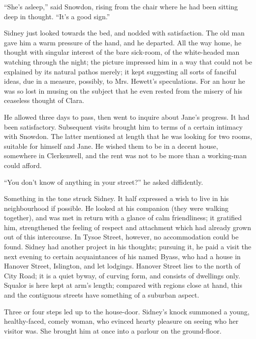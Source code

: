 ``She's asleep,'' said Snowdon, rising from the chair where he had been
sitting deep in thought. ``It's a good sign.''

Sidney just looked towards the bed, and nodded with satisfaction. The
old man gave him a warm pressure of the hand, and he departed. All the
way home, he thought with singular interest of the bare sick-room, of
the white-headed man watching through the night; the picture impressed
him in a way that could not be explained by its natural pathos merely;
it kept suggesting all sorts of fanciful ideas, due in a measure,
possibly, to Mrs. Hewett's speculations. For an hour he was so lost in
musing on the subject that he even rested from the misery of his
ceaseless thought of Clara.

He allowed three days to pass, then went to inquire about Jane's
progress. It had been {\protect\hypertarget{155}{}{}}satisfactory.
Subsequent visits brought him to terms of a certain intimacy with
Snowdon. The latter mentioned at length that he was looking for two
rooms, suitable for himself and Jane. He wished them to be in a decent
house, somewhere in Clerkenwell, and the rent was not to be more than a
working-man could afford.

``You don't know of anything in your street?'' he asked diffidently.

Something in the tone struck Sidney. It half expressed a wish to live in
his neighbourhood if possible. He looked at his companion (they were
walking together), and was met in return with a glance of calm
friendliness; it gratified him, strengthened the feeling of respect and
attachment which had already grown out of this intercourse. In Tysoe
Street, however, no accommodation could be found. Sidney had another
project in his thoughts; pursuing it, he paid a visit the next evening
to certain acquaintances of his named Byass, who had a house in Hanover
Street, Islington, and let lodgings. Hanover Street
{\protect\hypertarget{156}{}{}}lies to the north of City Road; it is a
quiet byway, of curving form, and consists of dwellings only. Squalor is
here kept at arm's length; compared with regions close at hand, this and
the contiguous streets have something of a suburban aspect.

Three or four steps led up to the house-door. Sidney's knock summoned a
young, healthy-faced, comely woman, who evinced hearty pleasure on
seeing who her visitor was. She brought him at once into a parlour on
the ground-floor.

